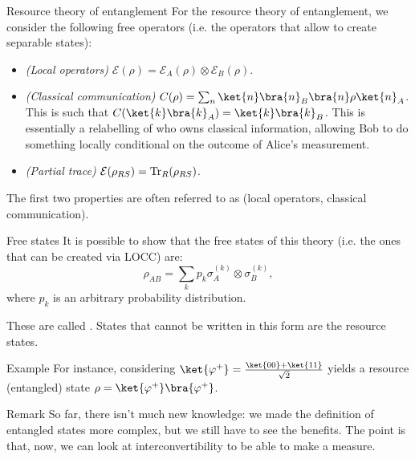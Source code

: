 \documentclass[a4paper]{article}
\begin{document}
\begin{parag}{Resource theory of entanglement}
    For the resource theory of entanglement, we consider the following free operators (i.e. the operators that allow to create separable states):
    \begin{itemize}
        \item \textit{(Local operators)} $\mathcal{E}\left(\rho\right) = \mathcal{E}_A\left(\rho\right) \otimes \mathcal{E}_B\left(\rho\right)$.
        \item \textit{(Classical communication)} $C\left(\rho\right) = \sum_{n} \ket{n}\bra{n}_B \bra{n}\rho \ket{n}_A$. This is such that $C\left(\ket{k}\bra{k}_A\right) = \ket{k}\bra{k}_B$. This is essentially a relabelling of who owns classical information, allowing Bob to do something locally conditional on the outcome of Alice's measurement.
        \item \textit{(Partial trace)} $\mathcal{E}\left(\rho_{RS}\right) = \Tr_R\left(\rho_{RS}\right)$.
    \end{itemize}
    
    The first two properties are often referred to as  (local operators, classical communication).

    \begin{subparag}{Free states}
        It is possible to show that the free states of this theory (i.e. the ones that can be created via LOCC) are:
        \[\rho_{AB} = \sum_{k} p_k \sigma_A^{\left(k\right)} \otimes \sigma_B^{\left(k\right)},\]
        where $p_k$ is an arbitrary probability distribution.
        
        These are called . States that cannot be written in this form are the resource states.
    \end{subparag}

    \begin{subparag}{Example}
        For instance, considering $\ket{\phi^+} = \frac{\ket{00} + \ket{11}}{\sqrt{2}}$ yields a resource (entangled) state $\rho = \ket{\phi^+}\bra{\phi^+}$.
    \end{subparag}

    \begin{subparag}{Remark}
        So far, there isn't much new knowledge: we made the definition of entangled states more complex, but we still have to see the benefits. The point is that, now, we can look at interconvertibility to be able to make a measure.
    \end{subparag}
\end{parag}
\end{document}
